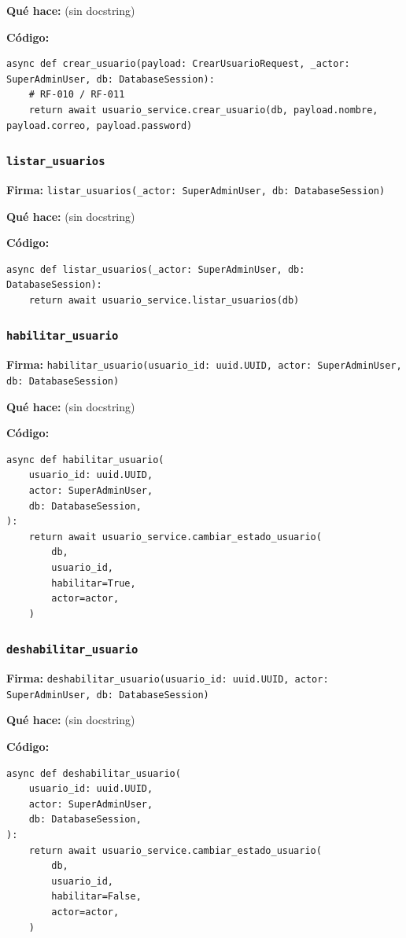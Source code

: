 \documentclass[11pt,a4paper]{article}
\begin{document}
\textbf{Qué hace:} (sin docstring)

\textbf{Código:}
\begin{lstlisting}
async def crear_usuario(payload: CrearUsuarioRequest, _actor: SuperAdminUser, db: DatabaseSession):
    # RF-010 / RF-011
    return await usuario_service.crear_usuario(db, payload.nombre, payload.correo, payload.password)
\end{lstlisting}

\subsubsection*{\texttt{listar\_usuarios}}
\textbf{Firma:} \texttt{listar\_usuarios(\_actor: SuperAdminUser, db: DatabaseSession)}

\textbf{Qué hace:} (sin docstring)

\textbf{Código:}
\begin{lstlisting}
async def listar_usuarios(_actor: SuperAdminUser, db: DatabaseSession):
    return await usuario_service.listar_usuarios(db)
\end{lstlisting}

\subsubsection*{\texttt{habilitar\_usuario}}
\textbf{Firma:} \texttt{habilitar\_usuario(usuario\_id: uuid.UUID, actor: SuperAdminUser, db: DatabaseSession)}

\textbf{Qué hace:} (sin docstring)

\textbf{Código:}
\begin{lstlisting}
async def habilitar_usuario(
    usuario_id: uuid.UUID,
    actor: SuperAdminUser,
    db: DatabaseSession,
):
    return await usuario_service.cambiar_estado_usuario(
        db,
        usuario_id,
        habilitar=True,
        actor=actor,
    )
\end{lstlisting}

\subsubsection*{\texttt{deshabilitar\_usuario}}
\textbf{Firma:} \texttt{deshabilitar\_usuario(usuario\_id: uuid.UUID, actor: SuperAdminUser, db: DatabaseSession)}

\textbf{Qué hace:} (sin docstring)

\textbf{Código:}
\begin{lstlisting}
async def deshabilitar_usuario(
    usuario_id: uuid.UUID,
    actor: SuperAdminUser,
    db: DatabaseSession,
):
    return await usuario_service.cambiar_estado_usuario(
        db,
        usuario_id,
        habilitar=False,
        actor=actor,
    )
\end{lstlisting}
\end{document}
